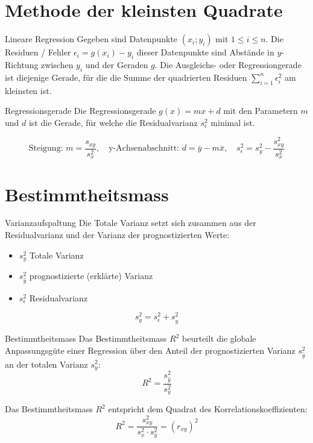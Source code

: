 \section{Methode der kleinsten Quadrate}
\begin{definition}{Lineare Regression}
Gegeben sind Datenpunkte $(x_i; y_i)$ mit $1 \leq i \leq n$. Die Residuen / Fehler $\epsilon_i=g(x_i)-y_i$ dieser Datenpunkte sind Abstände in $y$-Richtung zwischen $y_i$ und der Geraden $g$. Die Ausgleichs- oder Regressiongerade ist diejenige Gerade, für die die Summe der quadrierten Residuen $\sum_{i=1}^{n} \epsilon_i^2$ am kleinsten ist.
\end{definition}

\begin{theorem}{Regressionsgerade}
Die Regressionsgerade $g(x)=mx+d$ mit den Parametern $m$ und $d$ ist die Gerade, für welche die Residualvarianz $s_{\epsilon}^2$ minimal ist.

$$
\text{Steigung: } m=\frac{s_{xy}}{s_x^2}, \quad \text{y-Achsenabschnitt: } d=\bar{y}-m\bar{x}, \quad s_{\epsilon}^2=s_y^2-\frac{s_{xy}^2}{s_x^2}
$$
\end{theorem}

\section{Bestimmtheitsmass}
\begin{concept}{Varianzaufspaltung}
Die Totale Varianz setzt sich zusammen aus der Residualvarianz und der Varianz der prognostizierten Werte:
\begin{itemize}
  \item $s_y^2$ Totale Varianz
  \item $s_{\hat{y}}^2$ prognostizierte (erklärte) Varianz
  \item $s_{\epsilon}^2$ Residualvarianz
\end{itemize}

$$
s_y^2=s_{\epsilon}^2+s_{\hat{y}}^2
$$
\end{concept}

\begin{theorem}{Bestimmtheitsmass}
Das Bestimmtheitsmass $R^2$ beurteilt die globale Anpassungsgüte einer Regression über den Anteil der prognostizierten Varianz $s_{\hat{y}}^2$ an der totalen Varianz $s_y^2$:
$$
R^2=\frac{s_{\hat{y}}^2}{s_y^2}
$$

Das Bestimmtheitsmass $R^2$ entspricht dem Quadrat des Korrelationskoeffizienten:
$$
R^2=\frac{s_{xy}^2}{s_x^2 \cdot s_y^2}=(r_{xy})^2
$$
\end{theorem}

